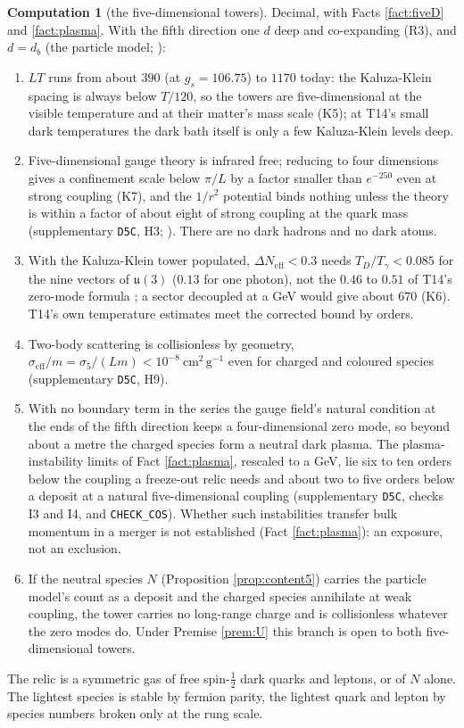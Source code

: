 \documentclass[11pt]{article}
\theoremstyle{definition}
\newtheorem{computation}[theorem]{Computation}
\newcommand{\Neff}{N_{\mathrm{eff}}}
\newcommand{\uu}{\mathfrak{u}}
\newcommand{\file}[1]{\texttt{#1}}
\begin{document}
\begin{computation}[the five-dimensional towers]\label{prop:fiveD}
Decimal, with Facts \ref{fact:fiveD} and \ref{fact:plasma}. With the fifth direction one $d$ deep and co-expanding (R3), and $d = d_{b}$ (the particle model; \cite[Prem.~7.4, Rem.~7.9, Rem.~7.14]{ButlerT14}):
\begin{enumerate}
\item[(i)] $LT$ runs from about $390$ (at $g_{s} = 106.75$) to $1170$ today: the Kaluza-Klein spacing is always below $T/120$, so the towers are five-dimensional at the visible temperature and at their matter's mass scale (K5); at T14's small dark temperatures the dark bath itself is only a few Kaluza-Klein levels deep.
\item[(ii)] Five-dimensional gauge theory is infrared free; reducing to four dimensions gives a confinement scale below $\pi/L$ by a factor smaller than $e^{-250}$ even at strong coupling (K7), and the $1/r^{2}$ potential binds nothing unless the theory is within a factor of about eight of strong coupling at the quark mass (supplementary \file{D5C}, H3; \cite{CLP2000}). There are no dark hadrons and no dark atoms.
\item[(iii)] With the Kaluza-Klein tower populated, $\Delta\Neff < 0.3$ needs $T_{D}/T_{\gamma} < 0.085$ for the nine vectors of $\uu(3)$ ($0.13$ for one photon), not the $0.46$ to $0.51$ of T14's zero-mode formula \cite[Prop.~6.3]{ButlerT14}; a sector decoupled at a GeV would give about $670$ (K6). T14's own temperature estimates meet the corrected bound by orders.
\item[(iv)] Two-body scattering is collisionless by geometry, $\sigma_{\mathrm{eff}}/m = \sigma_{5}/(Lm) < 10^{-8}\ \mathrm{cm^{2}\,g^{-1}}$ even for charged and coloured species (supplementary \file{D5C}, H9).
\item[(v)] With no boundary term in the series the gauge field's natural condition at the ends of the fifth direction keeps a four-dimensional zero mode, so beyond about a metre the charged species form a neutral dark plasma. The plasma-instability limits of Fact \ref{fact:plasma}, rescaled to a GeV, lie six to ten orders below the coupling a freeze-out relic needs and about two to five orders below a deposit at a natural five-dimensional coupling (supplementary \file{D5C}, checks I3 and I4, and \file{CHECK\_COS}). Whether such instabilities transfer bulk momentum in a merger is not established (Fact \ref{fact:plasma}): an exposure, not an exclusion.
\item[(vi)] If the neutral species $N$ (Proposition \ref{prop:content5}) carries the particle model's count as a deposit and the charged species annihilate at weak coupling, the tower carries no long-range charge and is collisionless whatever the zero modes do. Under Premise \ref{prem:U} this branch is open to both five-dimensional towers.
\end{enumerate}
The relic is a symmetric gas of free spin-$\tfrac{1}{2}$ dark quarks and leptons, or of $N$ alone. The lightest species is stable by fermion parity, the lightest quark and lepton by species numbers broken only at the rung scale.
\end{computation}
\end{document}
